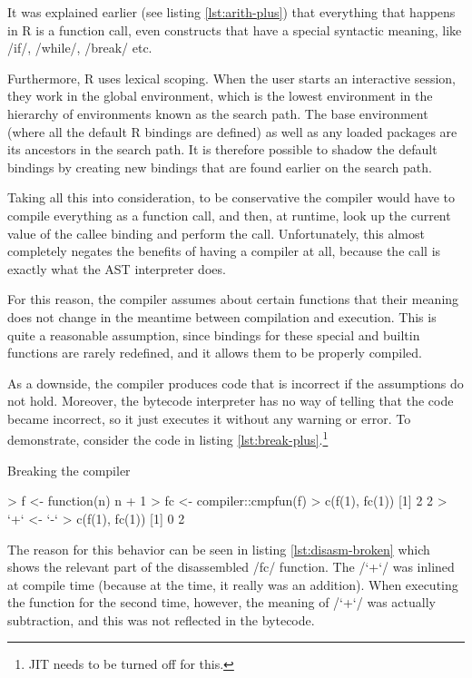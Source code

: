 {It was explained earlier (see listing \ref{lst:arith-plus}) that everything that happens in R is a function call, even constructs that have a special syntactic meaning, like \rinline/if/, \rinline/while/, \rinline/break/ etc.

Furthermore, R uses lexical scoping. When the user starts an interactive session, they work in the global environment, which is the lowest environment in the hierarchy of environments known as the search path. The base environment (where all the default R bindings are defined) as well as any loaded packages are its ancestors in the search path. It is therefore possible to shadow the default bindings by creating new bindings that are found earlier on the search path.

Taking all this into consideration, to be conservative the compiler would have to compile everything as a function call, and then, at runtime, look up the current value of the callee binding and perform the call. Unfortunately, this almost completely negates the benefits of having a compiler at all, because the call is exactly what the AST interpreter does.

For this reason, the compiler assumes about certain functions that their meaning does not change in the meantime between compilation and execution. This is quite a reasonable assumption, since bindings for these special and builtin functions are rarely redefined, and it allows them to be properly compiled.

As a downside, the compiler produces code that is incorrect if the assumptions do not hold. Moreover, the bytecode interpreter has no way of telling that the code became incorrect, so it just executes it without any warning or error. To demonstrate, consider the code in listing \ref{lst:break-plus}.\footnote{JIT needs to be turned off for this.}

\begin{listing}[htbp]
  \caption{\label{lst:break-plus}Breaking the compiler}
  \begin{rcode}
> f <- function(n) n + 1
> fc <- compiler::cmpfun(f)
> c(f(1), fc(1))
[1] 2 2
> `+` <- `-`
> c(f(1), fc(1))
[1] 0 2
  \end{rcode}
\end{listing}

The reason for this behavior can be seen in listing \ref{lst:disasm-broken} which shows the relevant part of the disassembled \rinline/fc/ function. The \rinline/`+`/ was inlined at compile time (because at the time, it really was an addition). When executing the function for the second time, however, the meaning of \rinline/`+`/ was actually subtraction, and this was not reflected in the bytecode.

}
